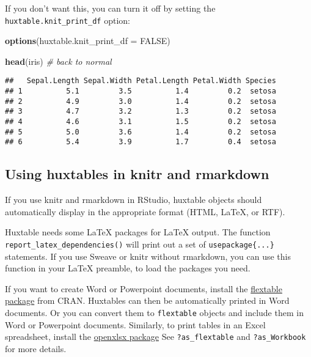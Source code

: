 \documentclass[]{article}
\newenvironment{Shaded}{\begin{snugshade}}{\end{snugshade}}
\newcommand{\CommentTok}[1]{\textcolor[rgb]{0.56,0.35,0.01}{\textit{#1}}}
\newcommand{\DataTypeTok}[1]{\textcolor[rgb]{0.13,0.29,0.53}{#1}}
\newcommand{\KeywordTok}[1]{\textcolor[rgb]{0.13,0.29,0.53}{\textbf{#1}}}
\newcommand{\NormalTok}[1]{#1}
\newcommand{\OtherTok}[1]{\textcolor[rgb]{0.56,0.35,0.01}{#1}}
\begin{document}
\FloatBarrier

If you don't want this, you can turn it off by setting the
\texttt{huxtable.knit\_print\_df} option:

\begin{Shaded}
\begin{Highlighting}[]
\KeywordTok{options}\NormalTok{(}\DataTypeTok{huxtable.knit_print_df =} \OtherTok{FALSE}\NormalTok{)}

\KeywordTok{head}\NormalTok{(iris) }\CommentTok{# back to normal}
\end{Highlighting}
\end{Shaded}

\begin{verbatim}
##   Sepal.Length Sepal.Width Petal.Length Petal.Width Species
## 1          5.1         3.5          1.4         0.2  setosa
## 2          4.9         3.0          1.4         0.2  setosa
## 3          4.7         3.2          1.3         0.2  setosa
## 4          4.6         3.1          1.5         0.2  setosa
## 5          5.0         3.6          1.4         0.2  setosa
## 6          5.4         3.9          1.7         0.4  setosa
\end{verbatim}

\FloatBarrier

\hypertarget{using-huxtables-in-knitr-and-rmarkdown}{%
\subsection{Using huxtables in knitr and
rmarkdown}\label{using-huxtables-in-knitr-and-rmarkdown}}

If you use knitr and rmarkdown in RStudio, huxtable objects should
automatically display in the appropriate format (HTML, LaTeX, or RTF).

Huxtable needs some LaTeX packages for LaTeX output. The function
\texttt{report\_latex\_dependencies()} will print out a set of
\texttt{usepackage\{...\}} statements. If you use Sweave or knitr
without rmarkdown, you can use this function in your LaTeX preamble, to
load the packages you need.

If you want to create Word or Powerpoint documents, install the
\href{https://cran.r-project.org/package=flextable}{flextable package}
from CRAN. Huxtables can then be automatically printed in Word
documents. Or you can convert them to \texttt{flextable} objects and
include them in Word or Powerpoint documents. Similarly, to print tables
in an Excel spreadsheet, install the
\href{https://cran.r-project.org/package=openxlsx}{openxlsx package} See
\texttt{?as\_flextable} and \texttt{?as\_Workbook} for more details.
\end{document}
